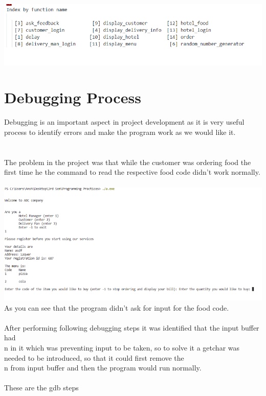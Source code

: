 \documentclass[12pt]{article}
\begin{document}
\includegraphics{profile_8.png}\\

\section{Debugging Process}
Debugging is an important aspect in project development as it is very useful process to identify errors and make the program work as we would like it.\\
\\
\\
The problem in the project was that while the customer was ordering food the first time he the command to read the respective food code didn't work normally.\\
\\
\includegraphics{problem.png} 
\\
As you can see that the program didn't ask for input for the food code.\\
\\
After performing following debugging steps it was identified that the input buffer had \\n in it which was preventing input to be taken, so to solve it a getchar was needed to be introduced, so that it could first remove the \\n from input buffer and then the program would run normally.\\
\\
These are the gdb steps\\
\\
\end{document}
